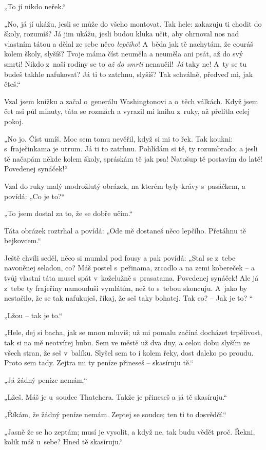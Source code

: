 „To jí nikdo neřek.“

„No, já jí ukážu, jesli se může do všeho montovat. Tak hele: zakazuju ti chodit do školy, rozumíš?  Já jim ukážu, jesli budou kluka učit, aby ohrnoval nos nad vlastním tátou a dělal ze sebe něco \textit{lepčího}! A~běda jak tě nachytám, že couráš kolem školy, slyšíš? Tvoje máma číst neuměla a neuměla ani psát, až do svý smrti! Nikdo z naší rodiny se to \textit{až do smrti} nenaučil! \textit{Já} taky ne! A~ty se tu budeš takhle nafukovat? Já ti to zatrhnu, slyšíš? Tak schválně, předveď mi, jak čteš.“

Vzal jsem knížku a začal o~generálu Washingtonovi a o~těch válkách. Když jsem čet asi půl minuty, táta se rozmách a vyrazil mi knihu z ruky, až přelítla celej pokoj.
 
„No jo. Číst umíš. Moc sem tomu nevěřil, když si mi to řek. Tak koukni: s frajeřinkama je utrum. Já ti to zatrhnu. Pohlídám si tě, ty rozumbrado; a jesli tě načapám někde kolem školy, spráskám tě jak psa! Natošup tě postavím do latě! Povedenej synáček!“

Vzal do ruky malý modrožlutý obrázek, na kterém byly krávy s pasáčkem, a povídá: „Co je to?“

„To jsem dostal za to, že se dobře učím.“

Táta obrázek roztrhal a povídá: „Ode mě dostaneš něco lepčího. Přetáhnu tě bejkovcem.“

Ještě chvíli seděl, něco si mumlal pod fousy a pak povídá: „Stal se z~tebe navoněnej seladon, co? Máš postel s~peřinama, zrcadlo a na zemi kobereček  – a tvůj vlastní táta musel spát v koželužně s~prasatama. Povedenej synáček! Ale já z tebe ty frajeřiny namouduši vymlátím, než to s~tebou skoncuju. A~jako by nestačilo, že se tak nafukuješ, říkaj, že seš taky bohatej. Tak co? – Jak je to? “
 
„Lžou – tak je to.“

„Hele, dej si bacha, jak se mnou mluvíš; už mi pomalu začíná docházet trpělivost, tak si na mě neotvírej hubu. Sem ve městě už dva dny, a celou dobu slyším ze všech stran, že seš v balíku. Slyšel sem to i kolem řeky, dost daleko po proudu. Proto sem tady. Zejtra mi ty peníze přineseš – skasíruju tě.“

„Já žádný peníze nemám.“

„Lžeš. Máš je u~soudce Thatchera. Takže je přineseš a já tě skasíruju.“

„Říkám, že žádný peníze nemám. Zeptej se soudce; ten ti to dosvědčí.“

„Jasně že se ho zeptám; musí je vysolit, a když ne, tak budu vědět proč. Řekni, kolik máš u~sebe? Hned tě skasíruju.“

